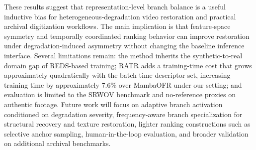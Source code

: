 These results suggest that representation-level branch balance is a useful inductive bias for heterogeneous-degradation video restoration and practical archival digitization workflows. The main implication is that feature-space symmetry and temporally coordinated ranking behavior can improve restoration under degradation-induced asymmetry without changing the baseline inference interface. Several limitations remain: the method inherits the synthetic-to-real domain gap of REDS-based training; RATR adds a training-time cost that grows approximately quadratically with the batch-time descriptor set, increasing training time by approximately 7.6\% over MambaOFR under our setting; and evaluation is limited to the SRWOV benchmark and no-reference proxies on authentic footage. Future work will focus on adaptive branch activation conditioned on degradation severity, frequency-aware branch specialization for structural recovery and texture restoration, lighter ranking constructions such as selective anchor sampling, human-in-the-loop evaluation, and broader validation on additional archival benchmarks.
